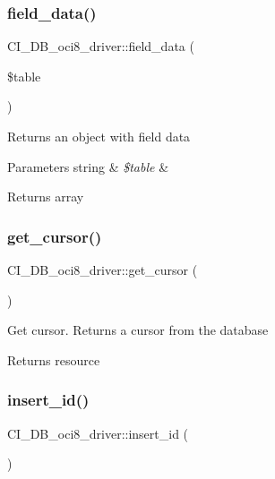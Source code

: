 \subsubsection{\texorpdfstring{field\+\_\+data()}{field\_data()}}
{\footnotesize\ttfamily C\+I\+\_\+\+D\+B\+\_\+oci8\+\_\+driver\+::field\+\_\+data (\begin{DoxyParamCaption}\item[{}]{\$table }\end{DoxyParamCaption})}

Returns an object with field data


\begin{DoxyParams}[1]{Parameters}
string & {\em \$table} & \\
\hline
\end{DoxyParams}
\begin{DoxyReturn}{Returns}
array 
\end{DoxyReturn}
\mbox{\label{class_c_i___d_b__oci8__driver_a78dcbceb7d8a821bf223630ce27a72de}} 
\subsubsection{\texorpdfstring{get\+\_\+cursor()}{get\_cursor()}}
{\footnotesize\ttfamily C\+I\+\_\+\+D\+B\+\_\+oci8\+\_\+driver\+::get\+\_\+cursor (\begin{DoxyParamCaption}{ }\end{DoxyParamCaption})}

Get cursor. Returns a cursor from the database

\begin{DoxyReturn}{Returns}
resource 
\end{DoxyReturn}
\mbox{\label{class_c_i___d_b__oci8__driver_ad358e7c4bab8c55d9397b51112ec5ac3}} 
\subsubsection{\texorpdfstring{insert\+\_\+id()}{insert\_id()}}
{\footnotesize\ttfamily C\+I\+\_\+\+D\+B\+\_\+oci8\+\_\+driver\+::insert\+\_\+id (\begin{DoxyParamCaption}{ }\end{DoxyParamCaption})}

